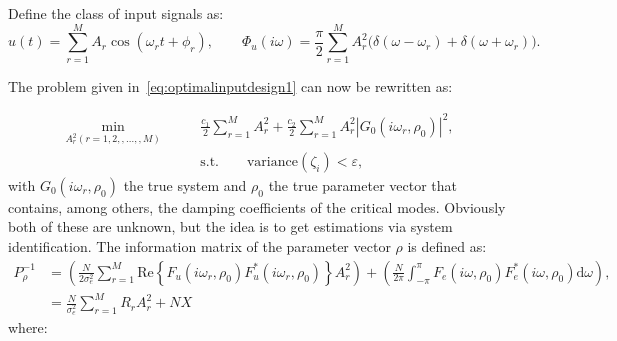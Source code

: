 \documentclass{article}
\begin{document}
Define the class of input signals as:
\begin{equation}
u(t) = \sum_{r=1}^{M} A_r \cos(\omega_r t + \phi_r), \qquad \Phi_u(i \omega) = \frac{\pi}{2} \sum_{r=1}^{M} A_r^2 \Big( \delta(\omega-\omega_r) + \delta(\omega+\omega_r) \Big). 
\end{equation}

The problem given in~\eqref{eq:optimalinputdesign1} can now be rewritten as:

\begin{equation}
\begin{aligned}
\min_{A_r^2 (r=1,2,,\ldots,,M)} \qquad & \frac{c_1}{2} \sum_{r=1}^{M} A_r^2 + \frac{c_2}{2} \sum_{r=1}^{M} A_r^2 |G_0(i\omega_r,\rho_0)|^2, \\
& \text{s.t.} \qquad \text{variance}(\zeta_i) < \varepsilon,
\label{eq:optimalinputdesign2}
\end{aligned}
\end{equation}
with $G_0(i\omega_r,\rho_0)$ the true system and $\rho_0$ the true parameter vector that contains, among others, the damping coefficients of the critical modes. Obviously both of these are unknown, but the idea is to get estimations via system identification. The information matrix of the parameter vector $\rho$ is defined as:
\begin{equation}
\begin{aligned}
P_\rho^{-1} &= \left( \frac{N}{2\sigma_e^2} \sum_{r=1}^{M} \text{Re} \left\{ F_u(i\omega_r,\rho_0) F^*_u(i\omega_r,\rho_0) \right\} A_r^2 \right) + \left( \frac{N}{2\pi} \int_{-\pi}^{\pi} F_e(i\omega,\rho_0) F^*_e(i\omega,\rho_0) \text{d} \omega \right), \\
            &= \frac{N}{\sigma_e^2} \sum_{r=1}^{M} R_r A_r^2 + N X
\end{aligned}
\label{eq:informationmatrix}
\end{equation}  
where:
\end{document}
